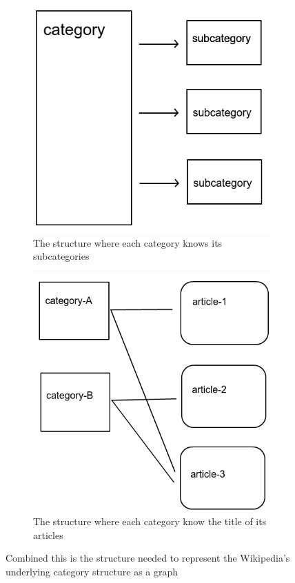 \begin{figure}
\centering
\begin{subfigure}[b]{0.4\textwidth}
\includegraphics[width=\textwidth]{Chapters/Implementation/category_subcategory}
\caption{The structure where each category knows its subcategories}
\label{fig:categorystructure}
\end{subfigure}
\begin{subfigure}[b]{0.4\textwidth}
\includegraphics[width=\textwidth]{Chapters/Implementation/categories-articles}
\caption{The structure where each category know the title of its articles}
\label{fig:catartstructure}
\end{subfigure}
\caption[The representation of the Wikipedia structure]{Combined this is the structure needed to represent the Wikipedia's underlying category structure as a graph}
\end{figure}


